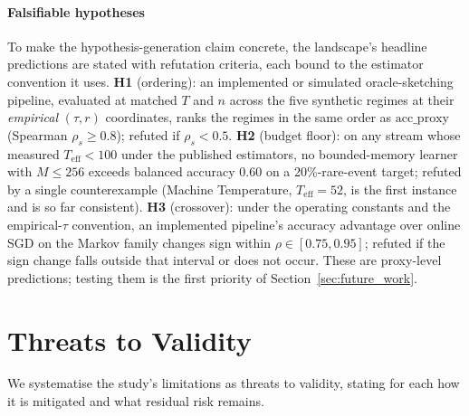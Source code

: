 \documentclass[sensors,article,submit,pdftex,moreauthors]{Definitions/mdpi}
\newcommand{\Teff}{T_{\mathrm{eff}}}
\begin{document}
\paragraph{Falsifiable hypotheses} To make the hypothesis-generation claim concrete, the landscape's headline predictions are stated with refutation criteria, each bound to the estimator convention it uses. \textbf{H1} (ordering): an implemented or simulated oracle-sketching pipeline, evaluated at matched $T$ and $n$ across the five synthetic regimes at their \emph{empirical} $(\tau, r)$ coordinates, ranks the regimes in the same order as $\mathrm{acc\_proxy}$ (Spearman $\rho_s \geq 0.8$); refuted if $\rho_s < 0.5$. \textbf{H2} (budget floor): on any stream whose measured $\Teff < 100$ under the published estimators, no bounded-memory learner with $M \leq 256$ exceeds balanced accuracy $0.60$ on a 20\%-rare-event target; refuted by a single counterexample (Machine Temperature, $\Teff = 52$, is the first instance and is so far consistent). \textbf{H3} (crossover): under the operating constants and the empirical-$\tau$ convention, an implemented pipeline's accuracy advantage over online SGD on the Markov family changes sign within $\rho \in [0.75, 0.95]$; refuted if the sign change falls outside that interval or does not occur. These are proxy-level predictions; testing them is the first priority of Section~\ref{sec:future_work}.


\section{Threats to Validity}
\label{sec:threats}

We systematise the study's limitations as threats to validity, stating for each how it is mitigated and what residual risk remains.
\end{document}

